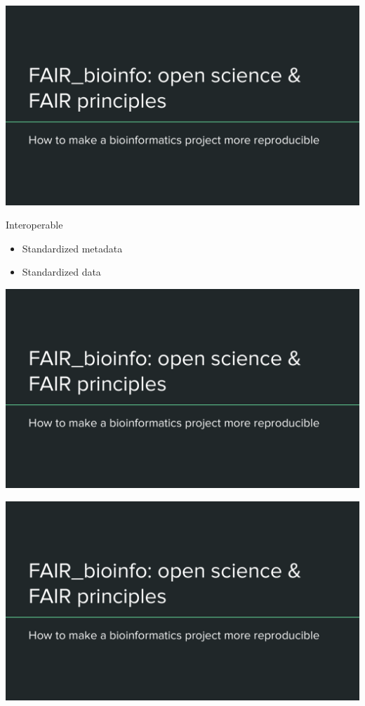 \begin{frame}
\includegraphics[page=10,scale=0.55]{01_OS_and_FAIR_intro.pdf}
\end{frame}
\begin{frame}
\begin{block}{Interoperable}
\begin{itemize}
\item Standardized metadata
\item Standardized data
\end{itemize}
\end{block}
\end{frame}

\begin{frame}
\includegraphics[page=11,scale=0.55]{01_OS_and_FAIR_intro.pdf}
\end{frame}

\begin{frame}
\includegraphics[page=12,scale=0.6]{01_OS_and_FAIR_intro.pdf}
\end{frame}

